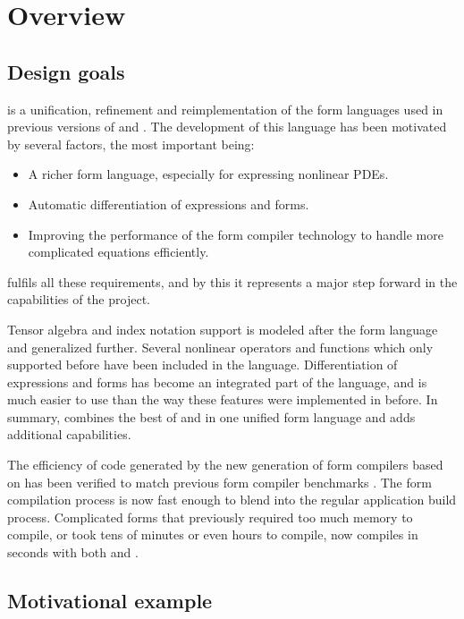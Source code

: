 \section{Overview} \label{ufl:sec:overview}

\subsection{Design goals} \label{ufl:sec:goals}
\ufl{} is a unification, refinement and reimplementation of
the form languages used in previous versions of \ffc{} and \sfc{}.
The development of this language has been motivated by several
factors, the most important being:
\begin{itemize}
\item A richer form language, especially for expressing nonlinear PDEs.
\item Automatic differentiation of expressions and forms.
\item Improving the performance of the form compiler technology to handle more complicated equations efficiently.
\end{itemize}
\ufl{} fulfils all these requirements, and by this it represents
a major step forward in the capabilities of the \fenics{} project.

Tensor algebra and index notation support is modeled after the \ffc{}
form language and generalized further. Several nonlinear operators and
functions which only \sfc{} supported before have been included in the
language.  Differentiation of expressions and forms has become an
integrated part of the language, and is much easier to use than the
way these features were implemented in \sfc{} before.  In summary,
\ufl{} combines the best of \ffc{} and \sfc{} in one unified form
language and adds additional capabilities.

The efficiency of code generated by the new generation of form
compilers based on \ufl{} has been verified to match previous form
compiler benchmarks \citep{AlnaesMardal2009b,OlgaardWells2010}.  The form
compilation process is now fast enough to blend into the regular
application build process.  Complicated forms that previously required
too much memory to compile, or took tens of minutes or even hours to
compile, now compiles in seconds with both \sfc{} and \ffc{}.

\subsection{Motivational example} \label{ufl:sec:example}

